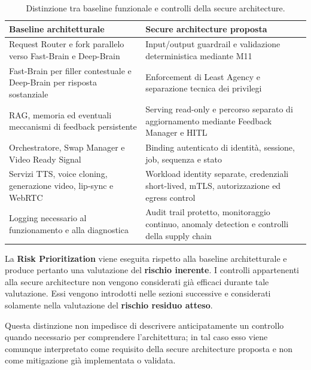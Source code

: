 \documentclass[11pt,a4paper]{article}
\begin{document}
\begin{table}[H]
\centering
\caption{Distinzione tra baseline funzionale e controlli della secure architecture.}
\label{tab:baseline-secure}
\small

\begin{tabularx}{\textwidth}{|Y|Y|}
\hline
\textbf{Baseline architetturale} &
\textbf{Secure architecture proposta}
\\
\hline

Request Router e fork parallelo verso Fast-Brain e Deep-Brain &
Input/output guardrail e validazione deterministica mediante M11
\\
\hline

Fast-Brain per filler contestuale e Deep-Brain per risposta sostanziale &
Enforcement di Least Agency e separazione tecnica dei privilegi
\\
\hline

RAG, memoria ed eventuali meccanismi di feedback persistente &
Serving read-only e percorso separato di aggiornamento mediante
Feedback Manager e HITL
\\
\hline

Orchestratore, Swap Manager e Video Ready Signal &
Binding autenticato di identità, sessione, job, sequenza e stato
\\
\hline

Servizi TTS, voice cloning, generazione video, lip-sync e WebRTC &
Workload identity separate, credenziali short-lived, mTLS,
autorizzazione ed egress control
\\
\hline

Logging necessario al funzionamento e alla diagnostica &
Audit trail protetto, monitoraggio continuo, anomaly detection e
controlli della supply chain
\\
\hline

\end{tabularx}
\end{table}

La \textbf{Risk Prioritization} viene eseguita rispetto alla baseline
architetturale e produce pertanto una valutazione del
\textbf{rischio inerente}. I controlli appartenenti alla secure
architecture non vengono considerati già efficaci durante tale
valutazione. Essi vengono introdotti nelle sezioni successive e
considerati solamente nella valutazione del
\textbf{rischio residuo atteso}.

Questa distinzione non impedisce di descrivere anticipatamente un
controllo quando necessario per comprendere l'architettura; in tal
caso esso viene comunque interpretato come requisito della secure
architecture proposta e non come mitigazione già implementata o
validata.
\end{document}
